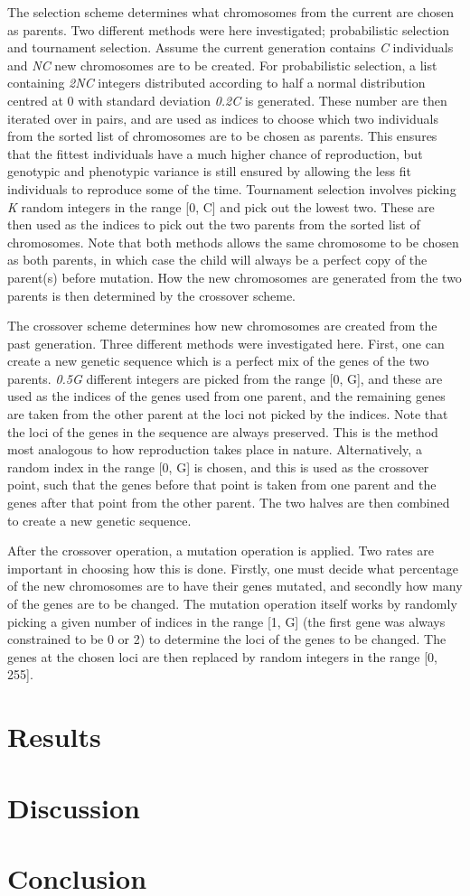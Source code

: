 \documentclass[multicolumn, 12pt]{extarticle}
\begin{document}
The selection scheme determines what chromosomes from the current are chosen as parents. Two different methods were here investigated; probabilistic selection and tournament selection. Assume the current generation contains \textit{C} individuals and \textit{NC} new chromosomes are to be created. For probabilistic selection, a list containing \textit{2NC} integers distributed according to half a normal distribution centred at 0 with standard deviation \textit{0.2C} is generated. These number are then iterated over in pairs, and are used as indices to choose which two individuals from the sorted list of chromosomes are to be chosen as parents. This ensures that the fittest individuals have a much higher chance of reproduction, but genotypic and phenotypic variance is still ensured by allowing the less fit individuals to reproduce some of the time. Tournament selection involves picking \textit{K} random integers in the range [0, C] and pick out the lowest two. These are then used as the indices to pick out the two parents from the sorted list of chromosomes. Note that both methods allows the same chromosome to be chosen as both parents, in which case the child will always be a perfect copy of the parent(s) before mutation. How the new chromosomes are generated from the two parents is then determined by the crossover scheme.

The crossover scheme determines how new chromosomes are created from the past generation. Three different methods were investigated here. First, one can create a new genetic sequence which is a perfect mix of the genes of the two parents. \textit{0.5G} different integers are picked from the range [0, G], and these are used as the indices of the genes used from one parent, and the remaining genes are taken from the other parent at the loci not picked by the indices. Note that the loci of the genes in the sequence are always preserved. This is the method most analogous to how reproduction takes place in nature. Alternatively, a random index in the range [0, G] is chosen, and this is used as the crossover point, such that the genes before that point is taken from one parent and the genes after that point from the other parent. The two halves are then combined to create a new genetic sequence. 

After the crossover operation, a mutation operation is applied. Two rates are important in choosing how this is done. Firstly, one must decide what percentage of the new chromosomes are to have their genes mutated, and secondly how many of the genes are to be changed. The mutation operation itself works by randomly picking a given number of indices in the range [1, G] (the first gene was always constrained to be 0 or 2) to determine the loci of the genes to be changed. The genes at the chosen loci are then replaced by random integers in the range [0, 255].

\section{Results}

\section{Discussion}

\section{Conclusion}


\end{document}
